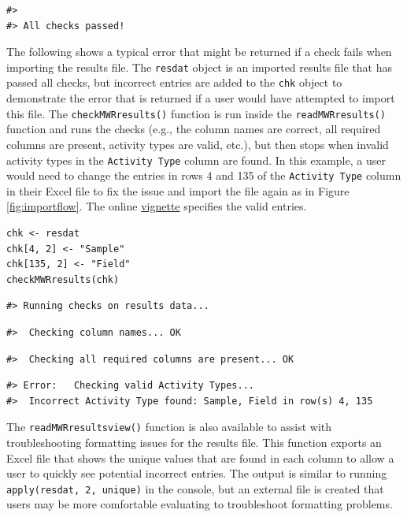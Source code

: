 \begin{verbatim}
#> 
#> All checks passed!
\end{verbatim}

The following shows a typical error that might be returned if a check fails when importing the results file. The \texttt{resdat} object is an imported results file that has passed all checks, but incorrect entries are added to the \texttt{chk} object to demonstrate the error that is returned if a user would have attempted to import this file. The \texttt{checkMWRresults()} function is run inside the \texttt{readMWRresults()} function and runs the checks (e.g., the column names are correct, all required columns are present, activity types are valid, etc.), but then stops when invalid activity types in the \texttt{Activity\ Type} column are found. In this example, a user would need to change the entries in rows 4 and 135 of the \texttt{Activity\ Type} column in their Excel file to fix the issue and import the file again as in Figure \ref{fig:importflow}. The online \href{https://massbays-tech.github.io/MassWateR/articles/inputs.html\#data-import-and-checks}{vignette} specifies the valid entries.

\begin{verbatim}
chk <- resdat
chk[4, 2] <- "Sample"
chk[135, 2] <- "Field"
checkMWRresults(chk)
\end{verbatim}

\begin{verbatim}
#> Running checks on results data...
\end{verbatim}

\begin{verbatim}
#>  Checking column names... OK
\end{verbatim}

\begin{verbatim}
#>  Checking all required columns are present... OK
\end{verbatim}

\begin{verbatim}
#> Error:   Checking valid Activity Types...
#>  Incorrect Activity Type found: Sample, Field in row(s) 4, 135
\end{verbatim}

The \texttt{readMWRresultsview()} function is also available to assist with troubleshooting formatting issues for the results file. This function exports an Excel file that shows the unique values that are found in each column to allow a user to quickly see potential incorrect entries. The output is similar to running \texttt{apply(resdat,\ 2,\ unique)} in the console, but an external file is created that users may be more comfortable evaluating to troubleshoot formatting problems.

